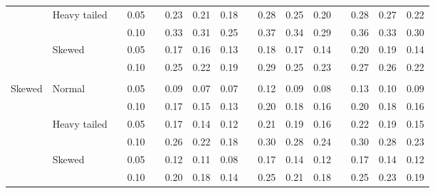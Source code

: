 \documentclass[12pt]{article} %
\begin{document}
\begin{table}[ht]
\begin{scriptsize}
\begin{center}
\begin{tabular}{ll p{.1cm} c p{.1cm} rrr p{.1cm} rrr p{.1cm} rrr}
             & Heavy tailed && 0.05 &&   0.23 & 0.21 & 0.18 && 0.28 & 0.25 & 0.20 &&  0.28 & 0.27 & 0.22 \\
             &              && 0.10 &&   0.33 & 0.31 & 0.25 && 0.37 & 0.34 & 0.29 &&  0.36 & 0.33 & 0.30 \\
             & Skewed       && 0.05 &&   0.17 & 0.16 & 0.13 && 0.18 & 0.17 & 0.14 &&  0.20 & 0.19 & 0.14 \\
             &              && 0.10 &&   0.25 & 0.22 & 0.19 && 0.29 & 0.25 & 0.23 &&  0.27 & 0.26 & 0.22 \\
             &&&&&&&&&&&&&&&\\
Skewed       & Normal       && 0.05 &&   0.09 & 0.07 & 0.07 && 0.12 & 0.09 & 0.08 &&  0.13 & 0.10 & 0.09 \\ 
             &              && 0.10 &&   0.17 & 0.15 & 0.13 && 0.20 & 0.18 & 0.16 &&  0.20 & 0.18 & 0.16 \\ 
             & Heavy tailed && 0.05 &&   0.17 & 0.14 & 0.12 && 0.21 & 0.19 & 0.16 &&  0.22 & 0.19 & 0.15 \\ 
             &              && 0.10 &&   0.26 & 0.22 & 0.18 && 0.30 & 0.28 & 0.24 &&  0.30 & 0.28 & 0.23 \\ 
             & Skewed       && 0.05 &&   0.12 & 0.11 & 0.08 && 0.17 & 0.14 & 0.12 &&  0.17 & 0.14 & 0.12 \\ 
             &              && 0.10 &&   0.20 & 0.18 & 0.14 && 0.25 & 0.21 & 0.18 &&  0.25 & 0.23 & 0.19 \\ 



\end{tabular}
\end{center}
\end{scriptsize}
\end{table}
\end{document}
